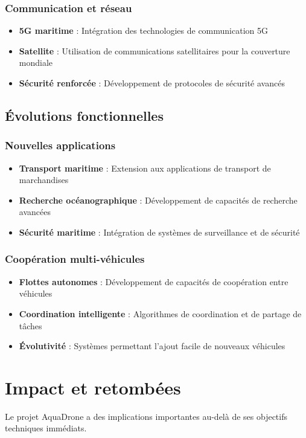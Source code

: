 {\subsubsection{Communication et réseau}
\begin{itemize}
    \item \textbf{5G maritime} : Intégration des technologies de communication 5G
    \item \textbf{Satellite} : Utilisation de communications satellitaires pour la couverture mondiale
    \item \textbf{Sécurité renforcée} : Développement de protocoles de sécurité avancés
\end{itemize}

\subsection{Évolutions fonctionnelles}
\subsubsection{Nouvelles applications}
\begin{itemize}
    \item \textbf{Transport maritime} : Extension aux applications de transport de marchandises
    \item \textbf{Recherche océanographique} : Développement de capacités de recherche avancées
    \item \textbf{Sécurité maritime} : Intégration de systèmes de surveillance et de sécurité
\end{itemize}

\subsubsection{Coopération multi-véhicules}
\begin{itemize}
    \item \textbf{Flottes autonomes} : Développement de capacités de coopération entre véhicules
    \item \textbf{Coordination intelligente} : Algorithmes de coordination et de partage de tâches
    \item \textbf{Évolutivité} : Systèmes permettant l'ajout facile de nouveaux véhicules
\end{itemize}

\section{Impact et retombées}
Le projet AquaDrone a des implications importantes au-delà de ses objectifs techniques immédiats.

}
